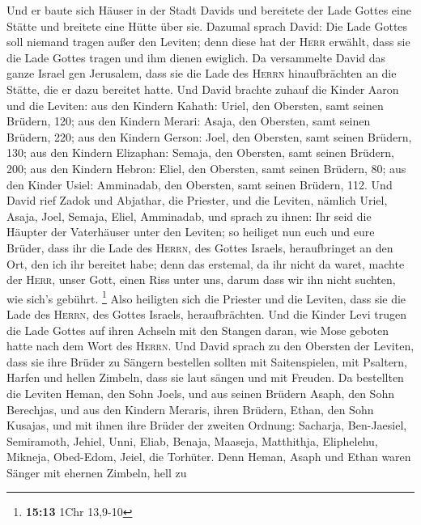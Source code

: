  Und er baute sich Häuser in der Stadt Davids und
bereitete der Lade Gottes eine Stätte und breitete eine Hütte über sie.
 Dazumal sprach David: Die Lade Gottes soll niemand tragen
außer den Leviten; denn diese hat der \textsc{Herr} erwählt, dass sie
die Lade Gottes tragen und ihm dienen ewiglich.  Da
versammelte David das ganze Israel gen Jerusalem, dass sie die Lade des
\textsc{Herrn} hinaufbrächten an die Stätte, die er dazu bereitet hatte.
 Und David brachte zuhauf die Kinder Aaron und die
Leviten:  aus den Kindern Kahath: Uriel, den Obersten,
samt seinen Brüdern, 120;  aus den Kindern Merari: Asaja,
den Obersten, samt seinen Brüdern, 220;  aus den Kindern
Gerson: Joel, den Obersten, samt seinen Brüdern, 130;  aus
den Kindern Elizaphan: Semaja, den Obersten, samt seinen Brüdern, 200;
 aus den Kindern Hebron: Eliel, den Obersten, samt seinen
Brüdern, 80;  aus den Kinder Usiel: Amminadab, den
Obersten, samt seinen Brüdern, 112.  Und David rief Zadok
und Abjathar, die Priester, und die Leviten, nämlich Uriel, Asaja, Joel,
Semaja, Eliel, Amminadab,  und sprach zu ihnen: Ihr seid
die Häupter der Vaterhäuser unter den Leviten; so heiliget nun euch und
eure Brüder, dass ihr die Lade des \textsc{Herrn}, des Gottes Israels,
heraufbringet an den Ort, den ich ihr bereitet habe; 
denn das erstemal, da ihr nicht da waret, machte der \textsc{Herr},
unser Gott, einen Riss unter uns, darum dass wir ihn nicht suchten, wie
sich's gebührt. \footnote{\textbf{15:13} 1Chr 13,9-10} 
Also heiligten sich die Priester und die Leviten, dass sie die Lade des
\textsc{Herrn}, des Gottes Israels, heraufbrächten.  Und
die Kinder Levi trugen die Lade Gottes auf ihren Achseln mit den Stangen
daran, wie Mose geboten hatte nach dem Wort des \textsc{Herrn}.
 Und David sprach zu den Obersten der Leviten, dass sie
ihre Brüder zu Sängern bestellen sollten mit Saitenspielen, mit
Psaltern, Harfen und hellen Zimbeln, dass sie laut sängen und mit
Freuden.  Da bestellten die Leviten Heman, den Sohn
Joels, und aus seinen Brüdern Asaph, den Sohn Berechjas, und aus den
Kindern Meraris, ihren Brüdern, Ethan, den Sohn Kusajas, 
und mit ihnen ihre Brüder der zweiten Ordnung: Sacharja, Ben-Jaesiel,
Semiramoth, Jehiel, Unni, Eliab, Benaja, Maaseja, Matthithja,
Eliphelehu, Mikneja, Obed-Edom, Jeiel, die Torhüter. 
Denn Heman, Asaph und Ethan waren Sänger mit ehernen Zimbeln, hell zu

